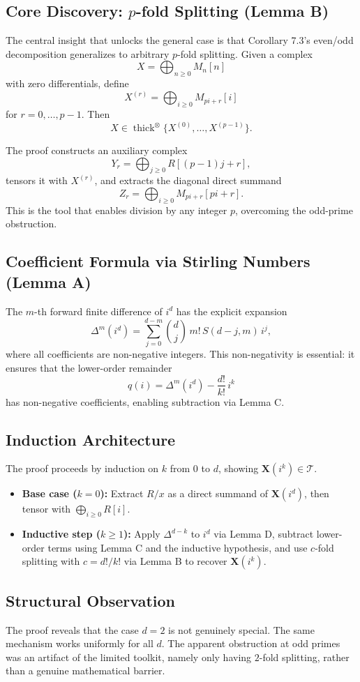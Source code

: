 \documentclass[11pt]{article}
\newcommand{\XX}{\mathbf{X}}
\newcommand{\TT}{\mathcal{T}}
\newcommand{\thicktensor}[1]{\operatorname{thick}^{\otimes}\{#1\}}
\begin{document}
\subsection{Core Discovery: $p$-fold Splitting (Lemma B)}

The central insight that unlocks the general case is that Corollary 7.3's even/odd decomposition generalizes to arbitrary $p$-fold splitting. Given a complex
\[
X=\bigoplus_{n \geqslant 0} M_n[n]
\]
with zero differentials, define
\[
X^{(r)}=\bigoplus_{i \geqslant 0} M_{pi+r}[i]
\]
for $r=0,\ldots,p-1$. Then
\[
X \in \thicktensor{X^{(0)},\ldots,X^{(p-1)}}.
\]

The proof constructs an auxiliary complex
\[
Y_r=\bigoplus_{j \geqslant 0} R[(p-1)j+r],
\]
tensors it with $X^{(r)}$, and extracts the diagonal direct summand
\[
Z_r=\bigoplus_{i \geqslant 0} M_{pi+r}[pi+r].
\]
This is the tool that enables division by any integer $p$, overcoming the odd-prime obstruction.

\subsection{Coefficient Formula via Stirling Numbers (Lemma A)}

The $m$-th forward finite difference of $i^d$ has the explicit expansion
\[
\Delta^m(i^d)=\sum_{j=0}^{d-m}\binom{d}{j}\,m!\,S(d-j,m)\,i^j,
\]
where all coefficients are non-negative integers. This non-negativity is essential: it ensures that the lower-order remainder
\[
q(i)=\Delta^m(i^d)-\frac{d!}{k!}\,i^k
\]
has non-negative coefficients, enabling subtraction via Lemma C.

\subsection{Induction Architecture}

The proof proceeds by induction on $k$ from $0$ to $d$, showing $\XX(i^k)\in\TT$.
\begin{itemize}
\item \textbf{Base case ($k=0$):} Extract $R/x$ as a direct summand of $\XX(i^d)$, then tensor with $\bigoplus_{i \geqslant 0} R[i]$.
\item \textbf{Inductive step ($k \geqslant 1$):} Apply $\Delta^{d-k}$ to $i^d$ via Lemma D, subtract lower-order terms using Lemma C and the inductive hypothesis, and use $c$-fold splitting with $c=d!/k!$ via Lemma B to recover $\XX(i^k)$.
\end{itemize}

\subsection{Structural Observation}

The proof reveals that the case $d=2$ is not genuinely special. The same mechanism works uniformly for all $d$. The apparent obstruction at odd primes was an artifact of the limited toolkit, namely only having $2$-fold splitting, rather than a genuine mathematical barrier.
\end{document}
